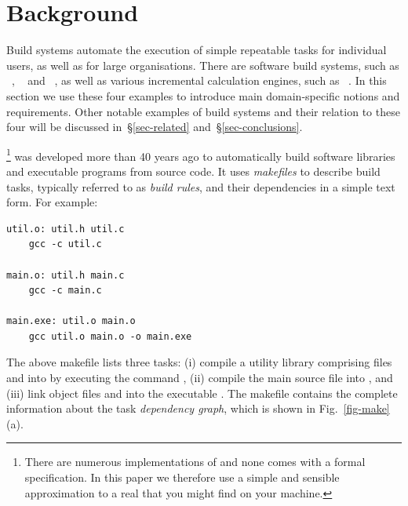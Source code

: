 \clearpage
\section{Background}\label{sec-background}

Build systems automate the execution of simple repeatable tasks for individual
users, as well as for large organisations. There are software build systems,
such as \Make~\cite{feldman1979make}, \Shake~\cite{mitchell2012shake} and
\Bazel~\cite{bazel}, as well as various incremental calculation engines, such
as \Excel~\cite{advanced_excel}. In this section we use these four examples to
introduce main domain-specific notions and requirements. Other notable examples
of build systems and their relation to these four will be discussed
in~\S\ref{sec-related} and~\S\ref{sec-conclusions}.

\Make\footnote{There are numerous implementations of \Make and none comes with a
formal specification. In this paper we therefore use a simple and sensible
approximation to a real \Make that you might find on your machine.} was developed
more than 40 years ago to automatically build software libraries and executable
programs from source code. It uses \emph{makefiles} to describe build tasks,
typically referred to as \emph{build rules}, and their dependencies in a simple
text form. For example:

\begin{verbatim}
util.o: util.h util.c
    gcc -c util.c

main.o: util.h main.c
    gcc -c main.c

main.exe: util.o main.o
    gcc util.o main.o -o main.exe
\end{verbatim}

\noindent
The above makefile lists three tasks: (i) compile a utility library comprising
files  and  into  by executing the command
, (ii) compile the main source file  into
, and (iii) link object files  and  into the
executable . The makefile contains the complete information about
the task \emph{dependency graph}, which is shown in Fig.~\ref{fig-make}(a).


